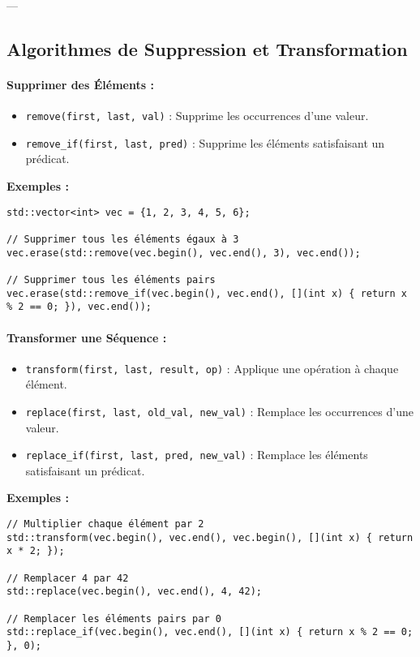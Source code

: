 ---

\subsection{ Algorithmes de Suppression et Transformation}
\paragraph{Supprimer des Éléments :}
\begin{itemize}
    \item \texttt{remove(first, last, val)} : Supprime les occurrences d'une valeur.
    \item \texttt{remove\_if(first, last, pred)} : Supprime les éléments satisfaisant un prédicat.
\end{itemize}

\textbf{Exemples :}
\begin{tcolorbox}[colframe=blue!50!black, colback=blue!5!white, title=Exemples de Suppression]
\begin{verbatim}
std::vector<int> vec = {1, 2, 3, 4, 5, 6};

// Supprimer tous les éléments égaux à 3
vec.erase(std::remove(vec.begin(), vec.end(), 3), vec.end());

// Supprimer tous les éléments pairs
vec.erase(std::remove_if(vec.begin(), vec.end(), [](int x) { return x % 2 == 0; }), vec.end());
\end{verbatim}
\end{tcolorbox}

\paragraph{Transformer une Séquence :}
\begin{itemize}
    \item \texttt{transform(first, last, result, op)} : Applique une opération à chaque élément.
    \item \texttt{replace(first, last, old\_val, new\_val)} : Remplace les occurrences d'une valeur.
    \item \texttt{replace\_if(first, last, pred, new\_val)} : Remplace les éléments satisfaisant un prédicat.
\end{itemize}

\textbf{Exemples :}
\begin{tcolorbox}[colframe=blue!50!black, colback=blue!5!white, title=Exemples de Transformation]
\begin{verbatim}
// Multiplier chaque élément par 2
std::transform(vec.begin(), vec.end(), vec.begin(), [](int x) { return x * 2; });

// Remplacer 4 par 42
std::replace(vec.begin(), vec.end(), 4, 42);

// Remplacer les éléments pairs par 0
std::replace_if(vec.begin(), vec.end(), [](int x) { return x % 2 == 0; }, 0);
\end{verbatim}
\end{tcolorbox}

